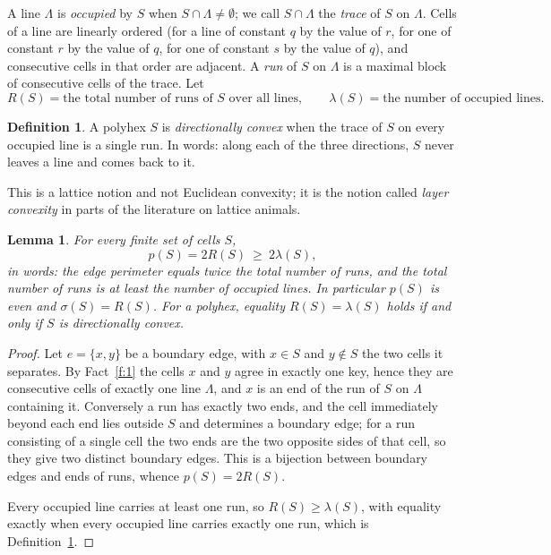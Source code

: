 \documentclass[11pt]{article}
\theoremstyle{plain}
\newtheorem{lemma}[theorem]{Lemma}
\theoremstyle{definition}
\newtheorem{definition}[theorem]{Definition}
\theoremstyle{remark}
\begin{document}
A line \(\Lambda\) is \emph{occupied} by \(S\) when \(S\cap\Lambda\neq\emptyset\); we call
\(S\cap\Lambda\) the \emph{trace} of \(S\) on \(\Lambda\). Cells of a line are linearly
ordered (for a line of constant \(q\) by the value of \(r\), for one of constant \(r\) by
the value of \(q\), for one of constant \(s\) by the value of \(q\)), and consecutive
cells in that order are adjacent. A \emph{run} of \(S\) on \(\Lambda\) is a maximal block
of consecutive cells of the trace. Let
\[
   R(S)=\text{the total number of runs of \(S\) over all lines},\qquad
   \lambda(S)=\text{the number of occupied lines}.
\]

\begin{definition}\label{def:dconv}
A polyhex \(S\) is \emph{directionally convex} when the trace of \(S\) on every occupied
line is a single run. In words: along each of the three directions, \(S\) never leaves a
line and comes back to it.
\end{definition}

This is a lattice notion and not Euclidean convexity; it is the notion called
\emph{layer convexity} in parts of the literature on lattice animals.

\begin{lemma}\label{lem:runs}
For every finite set of cells \(S\),
\begin{equation}\label{eq:pruns}
   p(S)=2R(S)\ \ge\ 2\lambda(S),
\end{equation}
in words: the edge perimeter equals twice the total number of runs, and the total number
of runs is at least the number of occupied lines. In particular \(p(S)\) is even and
\(\sigma(S)=R(S)\). For a polyhex, equality \(R(S)=\lambda(S)\) holds if and only if
\(S\) is directionally convex.
\end{lemma}

\begin{proof}
Let \(e=\{x,y\}\) be a boundary edge, with \(x\in S\) and \(y\notin S\) the two cells it
separates. By Fact~\ref{f:1} the cells \(x\) and \(y\) agree in exactly one key, hence
they are consecutive cells of exactly one line \(\Lambda\), and \(x\) is an end of the run
of \(S\) on \(\Lambda\) containing it. Conversely a run has exactly two ends, and the cell
immediately beyond each end lies outside \(S\) and determines a boundary edge; for a run
consisting of a single cell the two ends are the two opposite sides of that cell, so they
give two distinct boundary edges. This is a bijection between boundary edges and ends of
runs, whence \(p(S)=2R(S)\).

Every occupied line carries at least one run, so \(R(S)\ge\lambda(S)\), with equality
exactly when every occupied line carries exactly one run, which is
Definition~\ref{def:dconv}.
\end{proof}
\end{document}
